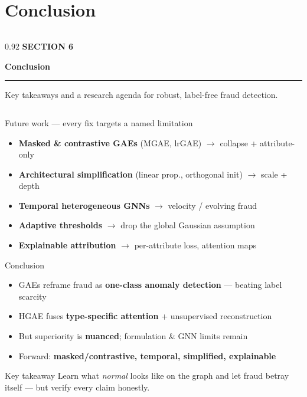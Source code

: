 \documentclass[10pt,aspectratio=169]{beamer}
\newcommand{\hl}[1]{\textcolor{mBlue}{\textbf{#1}}}    %
\newcommand{\bl}[1]{\textcolor{mDark}{\textbf{#1}}}    %
\newcommand{\gr}[1]{\textcolor{mGreen}{\textbf{#1}}}   %
\newcommand{\rd}[1]{\textcolor{mRed}{\textbf{#1}}}     %
\newenvironment{takeaway}{\begin{exampleblock}{Key takeaway}}{\end{exampleblock}}
\newcommand{\sectionintro}[3]{%
  \begingroup
  \setbeamercolor{background canvas}{bg=mDark}
  \begin{frame}[plain]
    \vfill
    \begin{columns}[c]
      \begin{column}{0.92\textwidth}
        {\color{mAccent}\large\textbf{SECTION #1}}\par
        \vspace{6pt}
        {\color{white}\Huge\textbf{#2}}\par
        \vspace{12pt}
        {\color{mAccent}\rule{6cm}{1.4pt}}\par
        \vspace{12pt}
        {\color{white!80}\large #3}\par
      \end{column}
    \end{columns}
    \vfill
  \end{frame}
  \endgroup
}
\begin{document}
\section{Conclusion}
\sectionintro{6}{Conclusion}
  {Key takeaways and a research agenda for robust, label-free fraud detection.}

\begin{frame}{Future work --- every fix targets a named limitation}
  \begin{itemize}\small
    \item \hl{Masked \& contrastive GAEs} (MGAE, lrGAE) $\rightarrow$ collapse + attribute-only
    \item \hl{Architectural simplification} (linear prop., orthogonal init) $\rightarrow$ scale + depth
    \item \hl{Temporal heterogeneous GNNs} $\rightarrow$ velocity / evolving fraud
    \item \hl{Adaptive thresholds} $\rightarrow$ drop the global Gaussian assumption
    \item \hl{Explainable attribution} $\rightarrow$ per-attribute loss, attention maps
  \end{itemize}
\end{frame}

\begin{frame}{Conclusion}
  \begin{itemize}
    \item GAEs reframe fraud as \gr{one-class anomaly detection} --- beating label scarcity
    \item HGAE fuses \hl{type-specific attention} + unsupervised reconstruction
    \item But superiority is \rd{nuanced}; formulation \& GNN limits remain
    \item Forward: \bl{masked/contrastive, temporal, simplified, explainable}
  \end{itemize}
  \begin{takeaway}
    Learn what \emph{normal} looks like on the graph and let fraud betray itself ---
    but verify every claim honestly.
  \end{takeaway}
\end{frame}
\end{document}
